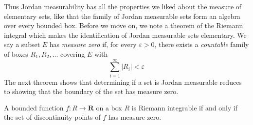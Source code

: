 Thus Jordan measurability has all the properties we liked about the measure of elementary sets, like that the family of Jordan measurable sets form an algebra over every bounded box. Before we move on, we note a theorem of the Riemann integral which makes the identification of Jordan measurable sets elementary. We say a subset $E$ has {\it measure zero} if, for every $\varepsilon > 0$, there exists a {\it countable} family of boxes $R_1, R_2, \dots$ covering $E$ with
%
\[ \sum_{i = 1}^\infty |R_i| < \varepsilon \]
%
The next theorem shows that determining if a set is Jordan measurable reduces to showing that the boundary of the set has measure zero.

\begin{theorem}
  A bounded function $f: R \to \mathbf{R}$ on a box $R$ is Riemann integrable if and only if the set of discontinuity points of $f$ has measure zero.
\end{theorem}

